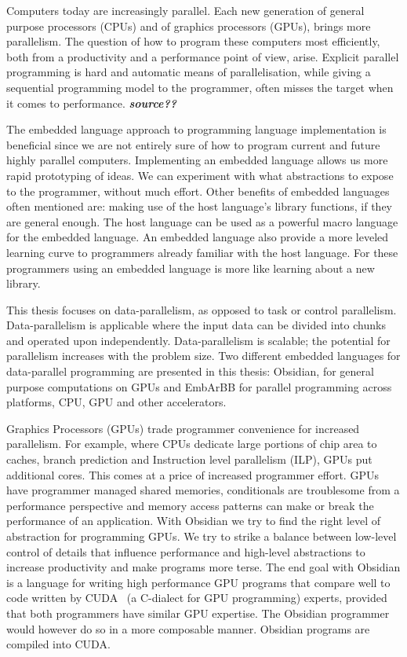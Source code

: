 \documentclass[a4paper]{book}
\begin{document}
Computers today are increasingly parallel. Each new generation of general purpose processors
(CPUs) and of graphics processors (GPUs), brings more parallelism. The question 
of how to program these computers most efficiently, both from a productivity and 
a performance point of view, arise. Explicit parallel programming is hard and automatic 
means of parallelisation, while giving a sequential programming model to the programmer, 
often misses the target when it comes to performance. {\bf \emph{source??}} 

The embedded language approach to programming language implementation is beneficial 
since we are not entirely sure of how to program current and future highly parallel 
computers. Implementing an embedded language allows us more rapid prototyping of ideas. 
We can experiment with what abstractions to expose to the programmer, without much 
effort. Other benefits of embedded languages often mentioned are: making use 
of the host language's library functions, if they are general enough. The host language 
can be used as a powerful macro language for the embedded language. An embedded 
language also provide a more leveled learning curve to programmers already familiar 
with the host language. For these programmers using an embedded language is more like  
learning about a new library. 

This thesis focuses on data-parallelism, as opposed to task or control parallelism.
Data-parallelism is applicable where the input data can be divided into chunks
and operated upon independently. Data-parallelism is scalable; the potential 
for parallelism increases with the problem size. Two different embedded languages 
for data-parallel programming are presented in this thesis: Obsidian, for 
general purpose computations on GPUs and EmbArBB for parallel programming across 
platforms, CPU, GPU and other accelerators. 

Graphics Processors (GPUs) trade programmer convenience for increased parallelism. 
For example, where CPUs dedicate large portions of chip area to caches, branch 
prediction and Instruction level parallelism (ILP), GPUs put additional cores. 
This comes at a price of increased programmer effort. GPUs have programmer managed 
shared memories, conditionals are troublesome from a performance 
perspective and memory access patterns can make or break the performance of an 
application. With Obsidian we try to find the right level of abstraction for 
programming GPUs. We try to strike a balance between low-level control of details 
that influence performance and high-level abstractions to increase productivity and 
make programs more terse. The end goal with Obsidian is a language for writing 
high performance GPU programs that compare well to code written by CUDA~\citet{CUDA}  
(a C-dialect for GPU programming) experts, provided that both programmers have 
similar GPU expertise. The Obsidian programmer would however do so in a more 
composable manner. Obsidian programs are compiled into CUDA.  
\end{document}
